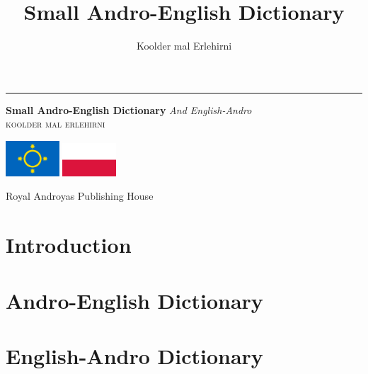 \documentclass[openany, twoside, b5paper]{book}
\begin{document}
\author{Koolder mal Erlehirni}
\title{Small Andro-English Dictionary}

\frontmatter

\begin{titlepage} %
    \newcommand*{\plogo}{\fbox{$\mathcal{AND}$}} %

    \raggedleft %

    \rule{1pt}{\textheight} %
    \hspace{0.05\textwidth} %
    \parbox[b]{0.75\textwidth}{ %

    {\Huge\bfseries Small Andro-English Dictionary}
        {\large\textit{And English-Andro}}\\[4\baselineskip]
    {\Large\textsc{koolder mal erlehirni}} %

    \bigskip

    \includegraphics[width=2cm]{androyas-flag}
    \includegraphics[width=2cm]{pl-flag}

    \vspace{0.5\textheight} %

    {\noindent Royal Androyas Publishing House~~\plogo}\\[\baselineskip] %
    }

\end{titlepage}

\clearpage


\tableofcontents

\mainmatter
\chapter{Introduction}


\chapter{Andro-English Dictionary}


\chapter{English-Andro Dictionary}


\backmatter
\end{document}
